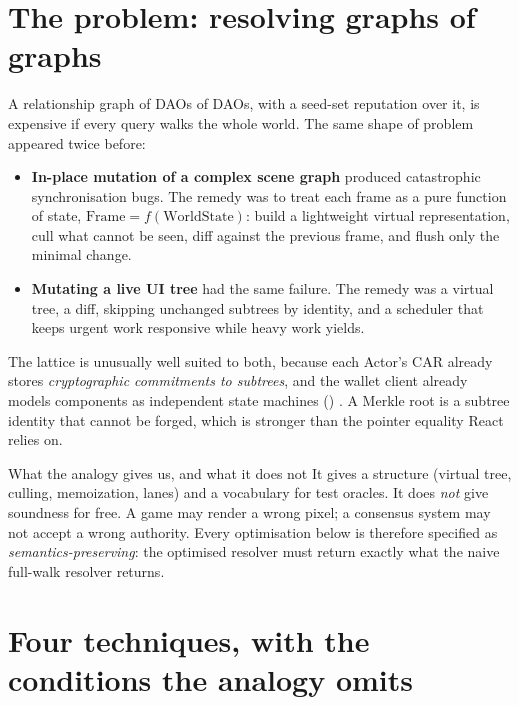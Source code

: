 \documentclass[a4paper,11pt,twoside,parskip=half-,headings=small]{scrartcl}
\begin{document}
\section{The problem: resolving graphs of graphs}
\label{sec:problem}

A relationship graph of DAOs of DAOs, with a seed-set reputation over it, is expensive if every query walks the whole world.
The same shape of problem appeared twice before:
\begin{itemize}
  \item \textbf{In-place mutation of a complex scene graph} produced catastrophic synchronisation bugs. The remedy was to treat each frame as a
        pure function of state, $\text{Frame}=f(\text{WorldState})$: build a lightweight virtual representation, cull what cannot be seen,
        diff against the previous frame, and flush only the minimal change.
  \item \textbf{Mutating a live UI tree} had the same failure. The remedy was a virtual tree, a diff, skipping unchanged subtrees by identity,
        and a scheduler that keeps urgent work responsive while heavy work yields.
\end{itemize}
The lattice is unusually well suited to both, because each Actor's CAR already stores \emph{cryptographic commitments to subtrees}, and the wallet client
already models components as independent state machines () . A Merkle root is a subtree identity that cannot be forged, which is stronger than the pointer equality React relies on.

\begin{keybox}{What the analogy gives us, and what it does not}
It gives a structure (virtual tree, culling, memoization, lanes) and a vocabulary for test oracles. It does \emph{not} give soundness for free. A game
may render a wrong pixel; a consensus system may not accept a wrong authority. Every optimisation below is therefore specified as
\emph{semantics-preserving}: the optimised resolver must return exactly what the naive full-walk resolver returns.
\end{keybox}

\section{Four techniques, with the conditions the analogy omits}
\label{sec:techniques}
\end{document}
